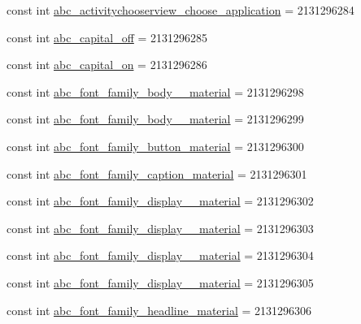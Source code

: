 \begin{DoxyCompactItemize}
\item 
const int \mbox{\hyperlink{class_f_w_p_s___app_1_1_droid_1_1_resource_1_1_string_a247019e53d22546fbd30dc192e02d54e}{abc\+\_\+activitychooserview\+\_\+choose\+\_\+application}} = 2131296284
\item 
const int \mbox{\hyperlink{class_f_w_p_s___app_1_1_droid_1_1_resource_1_1_string_a754f573383d7d62e1d0911de28af9ded}{abc\+\_\+capital\+\_\+off}} = 2131296285
\item 
const int \mbox{\hyperlink{class_f_w_p_s___app_1_1_droid_1_1_resource_1_1_string_ae97d7f1195c52231cc4fcc5ba9ee9fbc}{abc\+\_\+capital\+\_\+on}} = 2131296286
\item 
const int \mbox{\hyperlink{class_f_w_p_s___app_1_1_droid_1_1_resource_1_1_string_aa5f2ec7ad7ec94de40aae305c350eea1}{abc\+\_\+font\+\_\+family\+\_\+body\+\_\+\_\+material}} = 2131296298
\item 
const int \mbox{\hyperlink{class_f_w_p_s___app_1_1_droid_1_1_resource_1_1_string_a3477ff6d9582084f88cf82e029cda2df}{abc\+\_\+font\+\_\+family\+\_\+body\+\_\+\_\+material}} = 2131296299
\item 
const int \mbox{\hyperlink{class_f_w_p_s___app_1_1_droid_1_1_resource_1_1_string_ab1642a8aec9e29cf4eaa278abc4a929f}{abc\+\_\+font\+\_\+family\+\_\+button\+\_\+material}} = 2131296300
\item 
const int \mbox{\hyperlink{class_f_w_p_s___app_1_1_droid_1_1_resource_1_1_string_ad3d9bba47ef1297e42d9055ec555a871}{abc\+\_\+font\+\_\+family\+\_\+caption\+\_\+material}} = 2131296301
\item 
const int \mbox{\hyperlink{class_f_w_p_s___app_1_1_droid_1_1_resource_1_1_string_ab8b7c46d8b89bde1c4efe891ea3def9d}{abc\+\_\+font\+\_\+family\+\_\+display\+\_\+\_\+material}} = 2131296302
\item 
const int \mbox{\hyperlink{class_f_w_p_s___app_1_1_droid_1_1_resource_1_1_string_ac8ebbad524a1e6eaa493fde5cbb74ee3}{abc\+\_\+font\+\_\+family\+\_\+display\+\_\+\_\+material}} = 2131296303
\item 
const int \mbox{\hyperlink{class_f_w_p_s___app_1_1_droid_1_1_resource_1_1_string_aee01460b0aaa0e65748353b09f8eea5a}{abc\+\_\+font\+\_\+family\+\_\+display\+\_\+\_\+material}} = 2131296304
\item 
const int \mbox{\hyperlink{class_f_w_p_s___app_1_1_droid_1_1_resource_1_1_string_a0926665f229a6695abfc30733b9fb435}{abc\+\_\+font\+\_\+family\+\_\+display\+\_\+\_\+material}} = 2131296305
\item 
const int \mbox{\hyperlink{class_f_w_p_s___app_1_1_droid_1_1_resource_1_1_string_a79f17d42369df06c748e14e2d44da761}{abc\+\_\+font\+\_\+family\+\_\+headline\+\_\+material}} = 2131296306

\end{DoxyCompactItemize}
